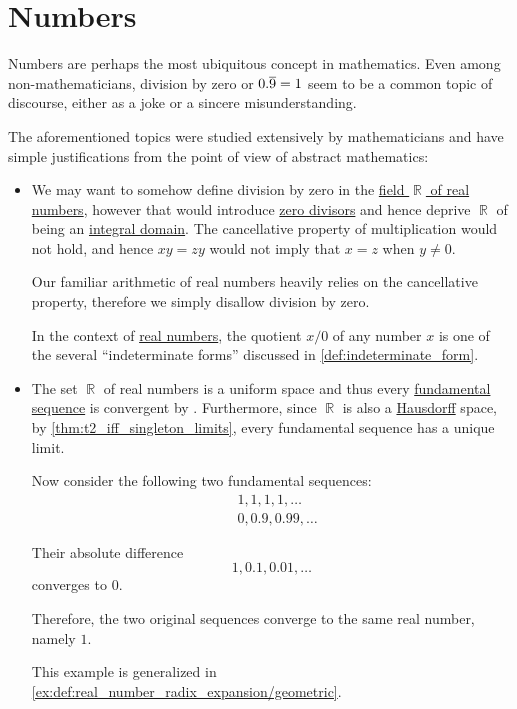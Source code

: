 \chapter{Numbers}\label{ch:numbers}

Numbers are perhaps the most ubiquitous concept in mathematics. Even among non-mathematicians, division by zero or \( 0.\oline{9} = 1 \) seem to be a common topic of discourse, either as a joke or a sincere misunderstanding.

The aforementioned topics were studied extensively by mathematicians and have simple justifications from the point of view of abstract mathematics:
\begin{itemize}
  \item We may want to somehow define division by zero in the \hyperref[def:real_numbers]{field \( \BbbR \) of real numbers}, however that would introduce \hyperref[def:divisibility/zero]{zero divisors} and hence deprive \( \BbbR \) of being an \hyperref[def:integral_domain]{integral domain}. The cancellative property of multiplication would not hold, and hence \( xy = zy \) would not imply that \( x = z \) when \( y \neq 0 \).

  Our familiar arithmetic of real numbers heavily relies on the cancellative property, therefore we simply disallow division by zero.

  In the context of \hyperref[def:real_numbers]{real numbers}, the quotient \( x / 0 \) of any number \( x \) is one of the several \enquote{indeterminate forms} discussed in \cref{def:indeterminate_form}.

  \item The set \( \BbbR \) of real numbers is a uniform space and thus every \hyperref[def:fundamental_net]{fundamental sequence} is convergent by . Furthermore, since \( \BbbR \) is also a \hyperref[def:separation_axioms/T2]{Hausdorff} space, by \cref{thm:t2_iff_singleton_limits}, every fundamental sequence has a unique limit.

  Now consider the following two fundamental sequences:
  \begin{align*}
    &1, 1, 1, 1, \ldots \\
    &0, 0.9, 0.99, \ldots
  \end{align*}

  Their absolute difference
  \begin{equation*}
    1, 0.1, 0.01, \ldots
  \end{equation*}
  converges to \( 0 \).

  Therefore, the two original sequences converge to the same real number, namely \( 1 \).

  This example is generalized in \cref{ex:def:real_number_radix_expansion/geometric}.
\end{itemize}

